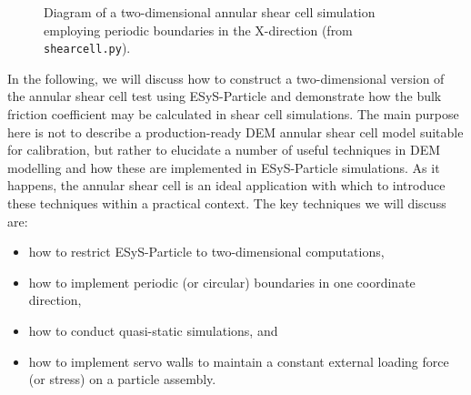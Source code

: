 \begin{figure}
\begin{center}
\end{center}
\caption{Diagram of a two-dimensional annular shear cell simulation employing periodic boundaries in the X-direction (from \texttt{shearcell.py}).} \label{fig:shearcell}
\end{figure}

In the following, we will discuss how to construct a two-dimensional version of the annular shear cell test using ESyS-Particle and demonstrate how the bulk friction coefficient may be calculated in shear cell simulations. The main purpose here is not to describe a production-ready DEM annular shear cell model suitable for calibration, but rather to elucidate a number of useful techniques in DEM modelling and how these are implemented in ESyS-Particle simulations.  As it happens, the annular shear cell is an ideal application with which to introduce these techniques within a practical context.  The key techniques we will discuss are:

\begin{itemize}
   \item how to restrict ESyS-Particle to two-dimensional computations,
   \item how to implement periodic (or circular) boundaries in one coordinate direction,
   \item how to conduct quasi-static simulations, and
   \item how to implement servo walls to maintain a constant external loading force (or stress) on a particle assembly.
\end{itemize}

